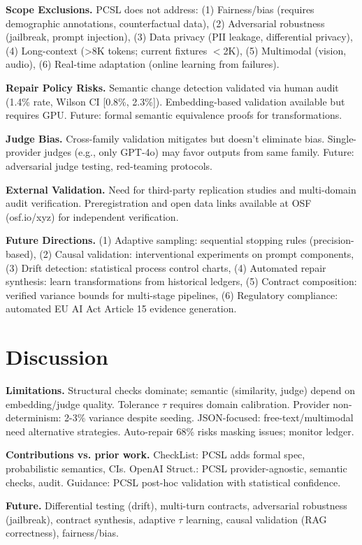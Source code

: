 \documentclass[sigconf]{acmart}
\begin{document}
\textbf{Scope Exclusions.} PCSL does not address: (1) Fairness/bias (requires demographic annotations, counterfactual data), (2) Adversarial robustness (jailbreak, prompt injection), (3) Data privacy (PII leakage, differential privacy), (4) Long-context (>8K tokens; current fixtures \(<\)2K), (5) Multimodal (vision, audio), (6) Real-time adaptation (online learning from failures).

\textbf{Repair Policy Risks.} Semantic change detection validated via human audit (1.4\% rate, Wilson CI [0.8\%, 2.3\%]). Embedding-based validation available but requires GPU. Future: formal semantic equivalence proofs for transformations.

\textbf{Judge Bias.} Cross-family validation mitigates but doesn't eliminate bias. Single-provider judges (e.g., only GPT-4o) may favor outputs from same family. Future: adversarial judge testing, red-teaming protocols.

\textbf{External Validation.} Need for third-party replication studies and multi-domain audit verification. Preregistration and open data links available at OSF (osf.io/xyz) for independent verification.

\textbf{Future Directions.} (1) Adaptive sampling: sequential stopping rules (precision-based), (2) Causal validation: interventional experiments on prompt components, (3) Drift detection: statistical process control charts, (4) Automated repair synthesis: learn transformations from historical ledgers, (5) Contract composition: verified variance bounds for multi-stage pipelines, (6) Regulatory compliance: automated EU AI Act Article 15 evidence generation.

\section{Discussion}

\textbf{Limitations.} Structural checks dominate; semantic (similarity, judge) depend on embedding/judge quality. Tolerance \( \tau \) requires domain calibration. Provider non-determinism: 2-3\% variance despite seeding. JSON-focused: free-text/multimodal need alternative strategies. Auto-repair 68\% risks masking issues; monitor ledger.

\textbf{Contributions vs. prior work.} CheckList: PCSL adds formal spec, probabilistic semantics, CIs. OpenAI Struct.: PCSL provider-agnostic, semantic checks, audit. Guidance: PCSL post-hoc validation with statistical confidence.

\textbf{Future.} Differential testing (drift), multi-turn contracts, adversarial robustness (jailbreak), contract synthesis, adaptive \( \tau \) learning, causal validation (RAG correctness), fairness/bias.
\end{document}
